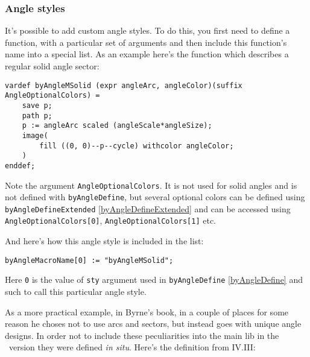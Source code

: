 \subsubsection{Angle styles}\label{AngleStyles}

	It's possible to add custom angle styles. To do this, you first need to define a function, with a particular set of arguments and then include this function's name into a special list. As an example here's the function which describes a regular solid angle sector:
	
\begin{lstlisting}
vardef byAngleMSolid (expr angleArc, angleColor)(suffix AngleOptionalColors) =
    save p;
    path p;
    p := angleArc scaled (angleScale*angleSize);
    image(
        fill ((0, 0)--p--cycle) withcolor angleColor;
    )
enddef;
\end{lstlisting}

	Note the argument \texttt{AngleOptionalColors}. It is not used for solid angles and is not defined with \texttt{byAngleDefine}, but several optional colors can be defined using \texttt{byAngleDefineExtended} \ref{byAngleDefineExtended} and can be accessed using \texttt{AngleOptionalColors[0]}, \texttt{AngleOptionalColors[1]} etc.

	And here's how this angle style is included in the list:

\begin{lstlisting}
byAngleMacroName[0] := "byAngleMSolid";
\end{lstlisting}

	Here \texttt{0} is the value of \texttt{sty} argument used in \texttt{byAngleDefine} \ref{byAngleDefine} and such to call this particular angle style.
	
	As a more practical example, in Byrne's book, in a couple of places for some reason he choses not to use arcs and sectors, but instead goes with unique angle designs. In order not to include these peculiarities into the main lib in the \ConTeXt\ version they were defined \textit{in situ}. Here's the definition from IV.III:

	
